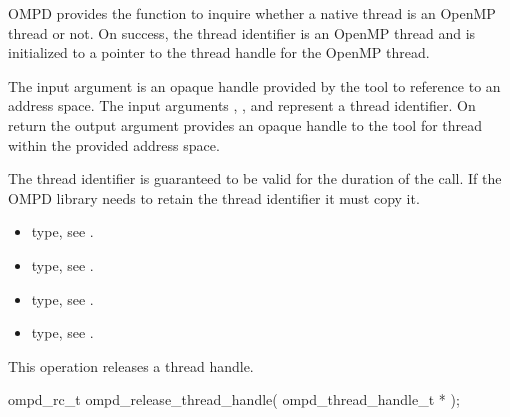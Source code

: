 \descr
OMPD provides the function 
to inquire whether a native thread is an OpenMP
thread or not.
On success, the thread identifier is an OpenMP thread and 
is initialized to a pointer to the thread handle for the OpenMP thread.

\argdesc


The input argument  is an opaque handle provided by the tool
to reference to an address space.
The input arguments ,  , and  represent a
thread identifier. 
On return the output argument  provides an opaque handle to the
tool for thread within the provided address space.

The thread identifier  is guaranteed to be valid for the duration of the call. If the 
OMPD library needs to retain the thread identifier it must copy it.





\crossreferences
\begin{itemize}
	\item {} type, see .
	\item {} type, see .
	\item {} type, see .
	\item {} type, see .
\end{itemize}

\label{subsubsubsec:ompd_release_thread_handle}
\summary
This operation releases a thread handle.

\format

\begin{cspecific}
\begin{ompSyntax}
ompd_rc_t ompd_release_thread_handle(
  ompd_thread_handle_t *
);
\end{ompSyntax}
\end{cspecific}


